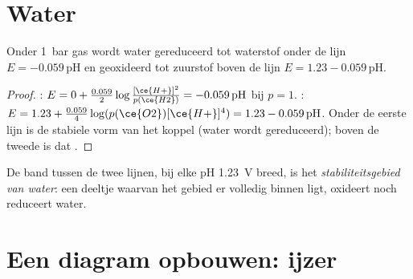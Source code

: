 \section{Water}

\begin{proposition}\label{prop:b1:e-ph-diagrams:water-lines}
Onder \qty{1}{bar} gas wordt water gereduceerd tot waterstof onder de
lijn $E = -0.059\,\mathrm{pH}$ en geoxideerd tot zuurstof boven de lijn
$E = 1.23
- 0.059\,\mathrm{pH}$.
\end{proposition}

\begin{proof}
: $E = 0 + \frac{0.059}{2}\log\frac{[\ce{H+}]^2}{p(\ce{H2})}
= -0.059\,\mathrm{pH}$ bij $p = 1$. : $E = 1.23 +
\frac{0.059}{4}\log(p(\ce{O2})[\ce{H+}]^4) = 1.23 - 0.059\,\mathrm{pH}$.
Onder de eerste lijn is  de stabiele vorm van het koppel (water
wordt gereduceerd); boven de tweede is dat .
\end{proof}

\begin{definition}\label{def:b1:e-ph-diagrams:water-domain}
De band tussen de twee lijnen, bij elke pH \qty{1.23}{V} breed, is het
\emph{stabiliteitsgebied van water}:
een deeltje waarvan het gebied er volledig binnen ligt, oxideert noch
reduceert water.
\end{definition}

\section{Een diagram opbouwen: ijzer}

